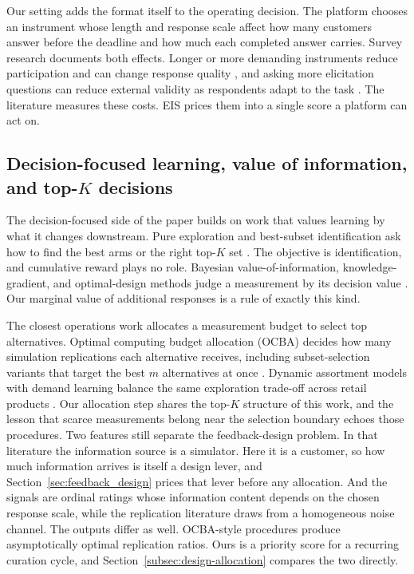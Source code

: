 \documentclass[11pt]{article}
\theoremstyle{definition}
\theoremstyle{remark}
\newcommand{\1}{\mathbf{1}}
\begin{document}
Our setting adds the format itself to the operating decision. The
platform chooses an instrument whose length and response scale affect
how many customers answer before the deadline and how much each
completed answer carries. Survey research documents both effects.
Longer or more demanding instruments reduce participation and can
change response quality
\citep{Krosnick1991,Galesic2009,Rolstad2011,Peytchev2009,FanYan2010,DillmanSmythChristian2014,Callegaro2015},
and asking more elicitation questions can reduce external validity as
respondents adapt to the task
\citep{HowellEbbesLiechty2021,LiEtAl2022MoreYouAsk}. The literature
measures these costs. EIS prices them into a single score a platform
can act on.

\subsection[Value of information and top-K decisions]{Decision-focused learning, value of information, and top-$K$ decisions}

The decision-focused side of the paper builds on work that values
learning by what it changes downstream. Pure exploration and best-subset identification ask how to find the best
arms or the right top-$K$ set
\citep{KalyanakrishnanEtAl,KaufmannEtAl,GabillonEtAl,ChenEtAlCPE,KalyanakrishnanTewari,KomiyamaEtAl,KvetonEtAl}. The objective is identification, and cumulative reward plays no role.
Bayesian value-of-information, knowledge-gradient, and optimal-design
methods judge a measurement by its decision value
\citep{FrazierPowellDayanik,RussoVanRoy,ChalonerVerdinelli1995,AtkinsonDonevTobias2007,SandorWedel2001,KesselsGoosVandebroek2006,BliemerRose2011,ElmachtoubGrigas2022}.
Our marginal value of additional responses is a rule of exactly this kind.

The closest operations work allocates a measurement budget to select
top alternatives. Optimal computing budget allocation (OCBA) decides
how many simulation replications each alternative receives, including subset-selection variants that target the best \(m\) alternatives at once \citep{ChenLinYucesanChick2000,ChickInoue2001,ChenHeFuLee2008}.
Dynamic assortment models with demand learning balance the same
exploration trade-off across retail products
\citep{CaroGallien2007,SaureZeevi2013}. Our allocation step shares the
top-\(K\) structure of this work, and the lesson that scarce
measurements belong near the selection boundary echoes those
procedures. Two features still separate the feedback-design problem.
In that literature the information source is a simulator. Here it is a
customer, so how much information arrives is itself a design lever, and
Section~\ref{sec:feedback_design} prices that lever before any
allocation. And the signals are ordinal ratings whose information content depends on
the chosen response scale, while the replication literature draws from a
homogeneous noise channel. The outputs differ as well. OCBA-style
procedures produce asymptotically optimal replication ratios. Ours is a
priority score for a recurring curation cycle, and
Section~\ref{subsec:design-allocation} compares the two directly.
\end{document}
